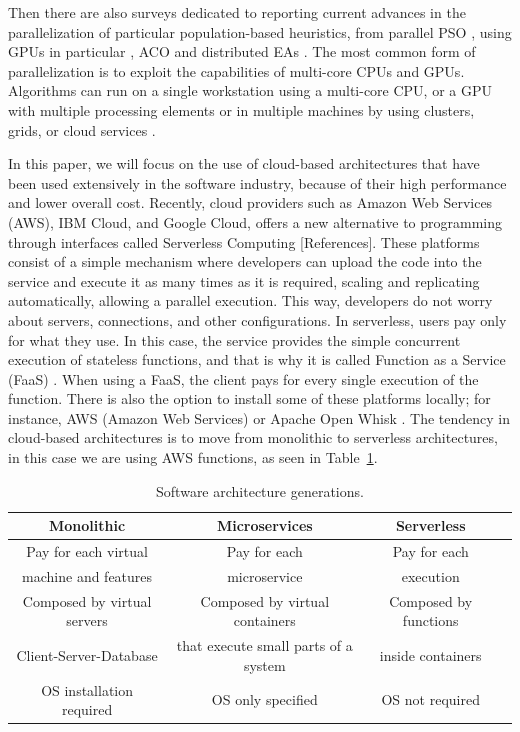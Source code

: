 \documentclass[runningheads]{llncs}
\begin{document}
Then there are also surveys dedicated to reporting current advances in the
parallelization of particular population-based heuristics, from parallel PSO
\cite{Lalwani2019}, using GPUs in particular \cite{tan2015survey}, ACO
\cite{pedemonte2011survey} and distributed EAs \cite{gong2015distributed}.  
The most common form of parallelization is to exploit the capabilities of
multi-core CPUs and GPUs. Algorithms can run on a single workstation using a
multi-core CPU, or a GPU with multiple processing elements or in multiple
machines by using clusters, grids, or cloud services \cite{Lalwani2019}.

In this paper, we will focus on the use of cloud-based architectures that have
been used extensively in the software industry, because of their high
performance and lower overall cost. Recently, cloud providers such as Amazon Web
Services (AWS), IBM Cloud, and Google Cloud, offers a new alternative to
programming through interfaces called Serverless Computing [References]. These
platforms consist of a simple mechanism where developers can upload the code
into the service and execute it as many times as it is required, scaling and
replicating automatically, allowing a parallel execution. This way, developers
do not worry about servers, connections, and other configurations. In
serverless, users pay only for what they use. In this case, the service provides
the simple concurrent execution of stateless functions, and that is why it is
called Function as a Service (FaaS) \cite{Hellerstein2018,Baird2016}
. When using a FaaS, the client pays for every single execution of the function.
There is also the option to install some of these platforms locally; for
instance, AWS (Amazon Web Services) \cite{Baird2016} or Apache Open Whisk
\cite{Guerv2018}. The tendency in cloud-based architectures is to move from 
monolithic to serverless architectures, in this case we are using AWS functions, as seen in Table~\ref{table:architectures}.     

\begin{table}[htp]
  \caption{Software architecture generations.}
  \label{table:architectures}
  \centering
  \begin{tabular}{|c|c|c|c|}
  \hline
  Monolithic & Microservices & Serverless \\
  \hline
  Pay for each virtual  & Pay for each  & Pay for each \\
  machine and features  & microservice  & execution \\
  \hline
  Composed by virtual servers  & Composed by virtual containers & Composed by functions \\
  Client-Server-Database & that execute small parts of a system & inside containers \\
  \hline
  OS installation required & OS only specified & OS not required\\
  \hline
  \end{tabular}
  \end{table}
\end{document}
